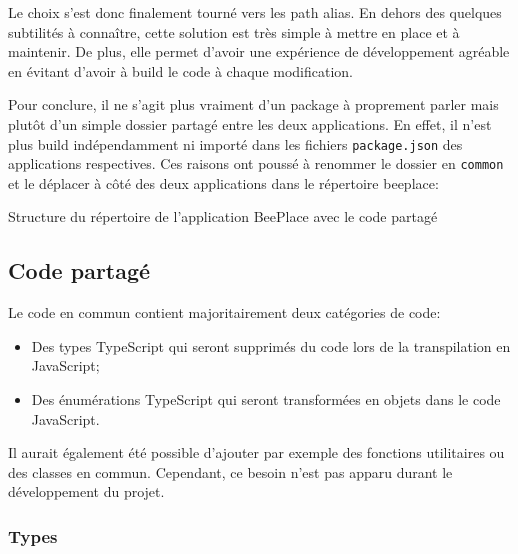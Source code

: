 Le choix s'est donc finalement tourné vers les path alias. En dehors des quelques subtilités à connaître, cette solution est très simple à mettre en place et à maintenir. De plus, elle permet d'avoir une expérience de développement agréable en évitant d'avoir à build le code à chaque modification.

Pour conclure, il ne s'agit plus vraiment d'un package à proprement parler mais plutôt d'un simple dossier partagé entre les deux applications. En effet, il n'est plus build indépendamment ni importé dans les fichiers \texttt{package.json} des applications respectives. Ces raisons ont poussé à renommer le dossier en \texttt{common} et le déplacer à côté des deux applications dans le répertoire beeplace:

\begin{listing}[H]
  \begin{tcolorbox}[arc=0mm,colback=white!5!white]
  \end{tcolorbox}
  \caption{Structure du répertoire de l'application BeePlace avec le code partagé}
  \label{listing:beeplace-repo-structure-v2}
\end{listing}

\subsection{Code partagé}

Le code en commun contient majoritairement deux catégories de code:

\begin{itemize}
  \item Des types TypeScript qui seront supprimés du code lors de la transpilation en JavaScript;
  \item Des énumérations TypeScript qui seront transformées en objets dans le code JavaScript.
\end{itemize}

Il aurait également été possible d'ajouter par exemple des fonctions utilitaires ou des classes en commun. Cependant, ce besoin n'est pas apparu durant le développement du projet.

\subsubsection{Types}

